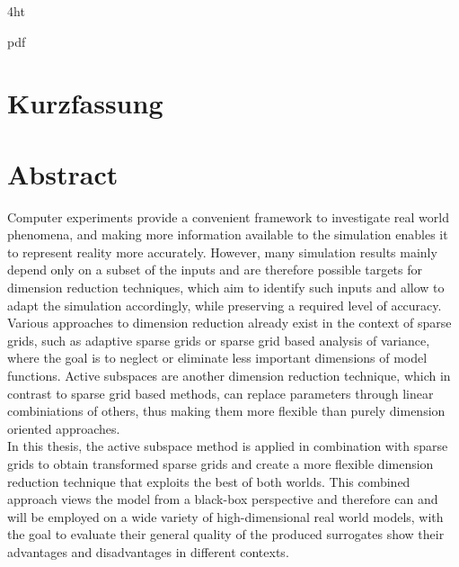 \documentclass[
  a4paper,  %
  twoside,  %
  bibliography=totoc,
  headsepline,
  cleardoublepage=empty,
  parskip=half,
  draft=false
]{scrbook}
\begin{document}
\iftex4ht
  \Configure{$}{\PicMath}{\EndPicMath}{}

  {pdf}
  {%
  }
\fi



\setcounter{page}{1}
\Titelblatt

\pagestyle{preamble}
\renewcommand*{\chapterpagestyle}{preamble}

\ifdeutsch
  \section*{Kurzfassung}
\else
  \section*{Abstract}
\fi

Computer experiments provide a convenient framework to investigate real world phenomena, and making more information available to the simulation enables it to represent reality more accurately.
However, many simulation results mainly depend only on a subset of the inputs and are therefore possible targets for dimension reduction techniques, which aim to identify such inputs and allow to adapt the simulation accordingly, while preserving a required level of accuracy.\\
Various approaches to dimension reduction already exist in the context of sparse grids, such as adaptive sparse grids or sparse grid based analysis of variance, where the goal is to neglect or eliminate less important dimensions of model functions.
Active subspaces are another dimension reduction technique, which in contrast to sparse grid based methods, can replace parameters through linear combiniations of others, thus making them more flexible than purely dimension oriented approaches.\\
In this thesis, the active subspace method is applied in combination with sparse grids to obtain transformed sparse grids and create a more flexible dimension reduction technique that exploits the best of both worlds.
This combined approach views the model from a black-box perspective and therefore can and will be employed on a wide variety of high-dimensional real world models, with the goal to evaluate their general quality of the produced surrogates show their advantages and disadvantages in different contexts.
\end{document}
